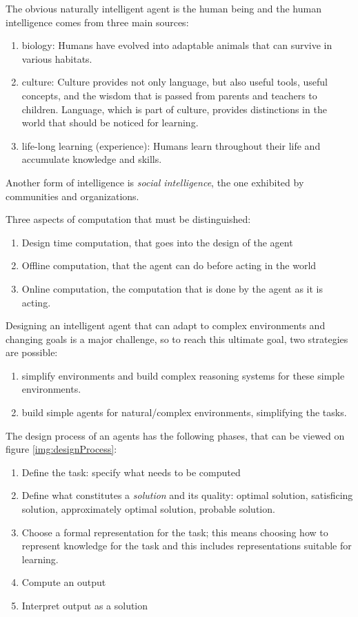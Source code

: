 The obvious naturally intelligent agent is the human being and the human intelligence
comes from three main sources:
\begin{enumerate}
    \item biology: Humans have evolved into adaptable animals that can survive in various habitats.
    \item culture: Culture provides not only language, but also useful tools, useful concepts, and 
          the wisdom that is passed from parents and teachers to children.\newline
          Language, which is part of culture, provides distinctions in the world that should be noticed for learning.
    \item life-long learning (experience): Humans learn throughout their life and accumulate knowledge and skills.
\end{enumerate}
Another form of intelligence is \emph{social intelligence}, the one exhibited by communities and organizations.

Three aspects of computation that must be distinguished:
\begin{enumerate}
    \item Design time computation, that goes into the design of the agent
    \item Offline computation, that the agent can do before acting in the world
    \item Online computation, the computation that is done by the agent as it is acting.
\end{enumerate}
Designing an intelligent agent that can adapt to complex environments and changing goals is a major challenge, so 
to reach this ultimate goal, two strategies are possible:
\begin{enumerate}
    \item simplify environments and build complex reasoning systems for these simple environments.
    \item build simple agents for natural/complex environments, simplifying the tasks.
\end{enumerate}
The design process of an agents has the following phases, that can be viewed on figure \ref{img:designProcess}:
\begin{enumerate}
    \item Define the task: specify what needs to be computed
    \item Define what constitutes a \emph{solution} and its quality: optimal solution,
          satisficing solution, approximately optimal solution, probable solution.
    \item Choose a formal representation for the task; this means choosing how to represent knowledge for the task
          and this includes representations suitable for learning.
    \item Compute an output
    \item Interpret output as a solution
\end{enumerate}

